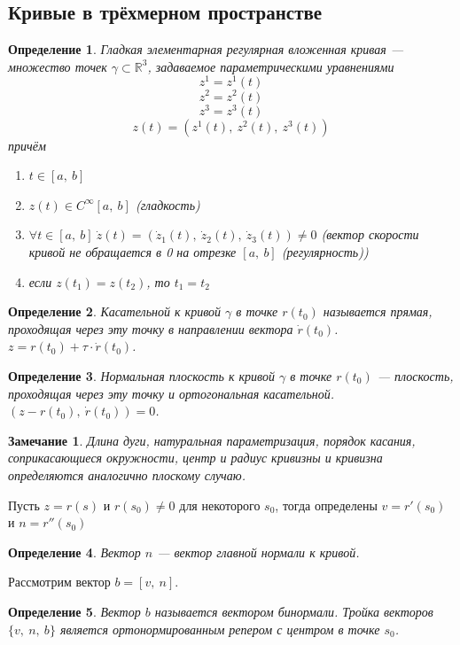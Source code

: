 \documentclass[12pt]{article}
\theoremstyle{plain}
\newtheorem{definition}{Определение}[section]
\newtheorem{remark}{Замечание}
\newcommand{\R}{\mathbb R}
\begin{document}
    \subsection{Кривые в трёхмерном пространстве}
    \begin{definition}
        Гладкая элементарная регулярная вложенная кривая --- множество точек $\gamma\subset\R^3$, задаваемое параметрическими уравнениями
        $$z^1=z^1(t)$$
        $$z^2=z^2(t)$$
        $$z^3=z^3(t)$$
        $$z(t)=(z^1(t), \ z^2(t), \ z^3(t))$$
        причём
        \begin{enumerate}
            \item $t\in[a, \ b]$
            \item $z(t)\in C^{\infty}[a,\ b]$ (гладкость)
            \item $\forall t\in[a, \ b] \ \dot{z}(t)=(\dot{z}_1(t), \ \dot{z}_2(t), \ \dot{z}_3(t))\neq0$ (вектор скорости кривой не обращается в 0 на отрезке $[a, \ b]$ (регулярность))
            \item если $z(t_1)=z(t_2)$, то $t_1=t_2$
        \end{enumerate}
    \end{definition}
    \begin{definition}
        Касательной к кривой $\gamma$ в точке $r(t_0)$ называется прямая, проходящая через эту точку в направлении вектора $\dot{r}(t_0)$. $z=r(t_0)+\tau\cdot\dot{r}(t_0)$.
    \end{definition}
    \begin{definition}
        Нормальная плоскость к кривой $\gamma$ в точке $r(t_0)$ --- плоскость, проходящая через эту точку и ортогональная касательной. $(z-r(t_0), \ \dot{r}(t_0))=0$.
    \end{definition}
    \begin{remark}
        Длина дуги, натуральная параметризация,  порядок касания, соприкасающиеся окружности, центр и радиус кривизны и кривизна определяются аналогично плоскому случаю.
    \end{remark}
    Пусть $z=r(s)$ и $r(s_0)\neq0$ для некоторого $s_0$, тогда определены $v=r'(s_0)$ и $n=r''(s_0)$
    \begin{definition}
        Вектор $n$ --- вектор главной нормали к кривой. 
    \end{definition}
    Рассмотрим вектор $b=[v, \ n]$.
    \begin{definition}
        Вектор $b$ называется вектором бинормали. Тройка векторов $\{v, \ n, \ b\}$ является ортонормированным репером с центром в точке $s_0$.
    \end{definition}
\end{document}
